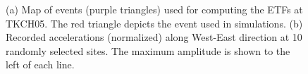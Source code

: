 \clearpage
{}
\begin{figure}[!ht]
   \hfil
  \caption{(a) Map of events (purple triangles) used for computing the ETFs at TKCH05. The red triangle depicts the event used in simulations. (b) Recorded accelerations (normalized) along West-East direction at 10 randomly selected sites. The maximum amplitude is shown to the left of each line.}
  \label{fig:etf-A2}
\end{figure}


